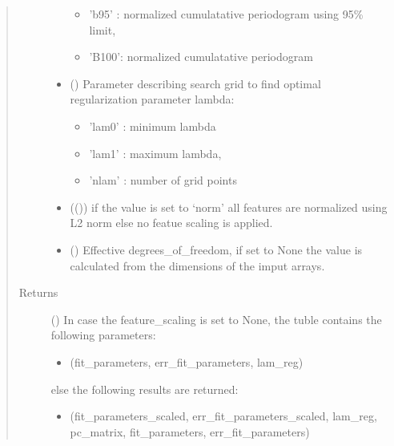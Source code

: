 \documentclass[a4paper,10pt,english]{sphinxmanual}
\begin{document}
\begin{fulllineitems}
\begin{quote}
\begin{description}
\begin{itemize}
\begin{itemize}
\item {} 
’b95’ :  normalized cumulatative periodogram using 95\% limit,

\item {} 
’B100’:  normalized cumulatative periodogram

\end{itemize}


\item {} 
 () \textendash{} 
Parameter describing search grid to find optimal regularization
parameter lambda:
\begin{itemize}
\item {} 
’lam0’ : minimum lambda

\item {} 
’lam1’ : maximum lambda,

\item {} 
’nlam’ : number of grid points

\end{itemize}


\item {} 
 (()) \textendash{} if the value is set to ‘norm’ all features are normalized using L2
norm else no featue scaling is applied.

\item {} 
 () \textendash{} Effective  degrees\_of\_freedom, if set to None the value is calculated
from the dimensions of the imput arrays.

\end{itemize}

\item[{Returns}] \leavevmode

 () \textendash{} In case the feature\_scaling is set to None, the tuble contains the
following parameters:
\begin{itemize}
\item {} 
(fit\_parameters, err\_fit\_parameters, lam\_reg)

\end{itemize}

else the following results are returned:
\begin{itemize}
\item {} 
(fit\_parameters\_scaled, err\_fit\_parameters\_scaled, lam\_reg,
pc\_matrix, fit\_parameters, err\_fit\_parameters)


\end{itemize}
\end{description}
\end{quote}
\end{fulllineitems}
\end{document}
